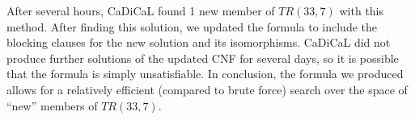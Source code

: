 \documentclass[conference]{IEEEtran}
\begin{document}
After several hours, CaDiCaL found 1 new member of $TR(33,7)$ with this method. After finding this solution, we updated the formula to include the blocking clauses for the new solution and its isomorphisms. CaDiCaL did not produce further solutions of the updated CNF for several days, so it is possible that the formula is simply unsatisfiable. In conclusion, the formula we produced allows for a relatively efficient (compared to brute force) search over the space of ``new'' members of $TR(33,7)$.





\end{document}
